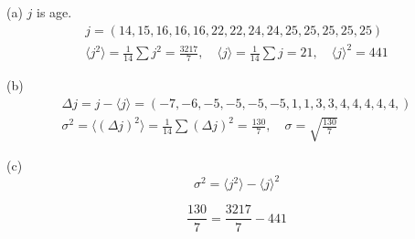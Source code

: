 


(a) $j$ is age.
\begin{gather*}
j=(14,15,16,16,16,22,22,24,24,25,25,25,25,25)
\\
\langle j^2\rangle=\frac{1}{14}\sum j^2=\frac{3217}{7},\quad
\langle j\rangle=\frac{1}{14}\sum j=21,\quad
\langle j\rangle^2=441
\end{gather*}

(b)
\begin{gather*}
\Delta j=j-\langle j\rangle=(-7,-6,-5,-5,-5,-5,1,1,3,3,4,4,4,4,4,)
\\
\sigma^2=\langle(\Delta j)^2\rangle=\frac{1}{14}\sum(\Delta j)^2=\frac{130}{7},\quad\sigma=\sqrt{\frac{130}{7}}
\end{gather*}

(c)
\begin{equation*}
\sigma^2=\langle j^2\rangle-\langle j\rangle^2\tag{1.12}
\end{equation*}

\begin{equation*}
\frac{130}{7}=\frac{3217}{7}-441
\end{equation*}


